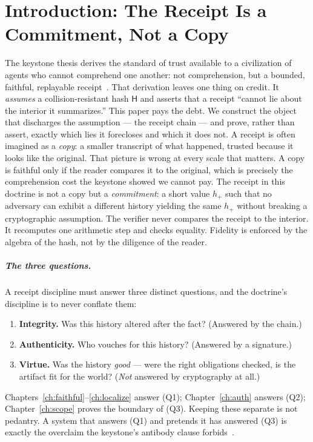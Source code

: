 \documentclass[11pt,oneside]{book}
\theoremstyle{definition}
\theoremstyle{plain}
\theoremstyle{remark}
\newcommand{\chainH}{\mathsf{H}}               %
\begin{document}
\tableofcontents

\mainmatter

\chapter{Introduction: The Receipt Is a Commitment, Not a Copy}
\label{ch:intro}

The keystone thesis derives the standard of trust available to a civilization of agents who
cannot comprehend one another: not comprehension, but a bounded, faithful, replayable
receipt~\cite{chatman2025}. %
That derivation leaves one thing on credit. %
It \emph{assumes} a
collision-resistant hash $\chainH$ and asserts that a receipt ``cannot lie about the interior
it summarizes.'' This paper pays the debt. %
We construct the object that discharges the
assumption --- the receipt chain --- and prove, rather than assert, exactly which lies it
forecloses and which it does not. %
A receipt is often imagined as a \emph{copy}: a smaller transcript of what happened, trusted
because it looks like the original. That picture is wrong at every scale that matters. %
A copy
is faithful only if the reader compares it to the original, which is precisely the
comprehension cost the keystone showed we cannot pay. %
The receipt in this doctrine is not a
copy but a \emph{commitment}: a short value $h_{+}$ such that no adversary can exhibit a
different history yielding the same $h_{+}$ without breaking a cryptographic assumption. %
The
verifier never compares the receipt to the interior. %
It recomputes one arithmetic step and
checks equality. %
Fidelity is enforced by the algebra of the hash, not by the diligence of the
reader. %

\paragraph{The three questions.} A receipt discipline must answer three distinct questions,
and the doctrine's discipline is to never conflate them: %
\begin{enumerate}[label=(Q\arabic*),leftmargin=*]
\item \textbf{Integrity.} Was this history altered after the fact? (Answered by the chain.) %
\item \textbf{Authenticity.} Who vouches for this history? (Answered by a signature.) %
\item \textbf{Virtue.} Was the history \emph{good} --- were the right obligations checked, is
the artifact fit for the world? (\emph{Not} answered by cryptography at all.) %
\end{enumerate}
Chapters~\ref{ch:faithful}--\ref{ch:localize} answer (Q1); Chapter~\ref{ch:auth} answers
(Q2); Chapter~\ref{ch:scope} proves the boundary of (Q3). %
Keeping these separate is not
pedantry. %
A system that answers (Q1) and pretends it has answered (Q3) is exactly the
overclaim the keystone's antibody clause forbids~\cite{chatman2025}. %
\end{document}
